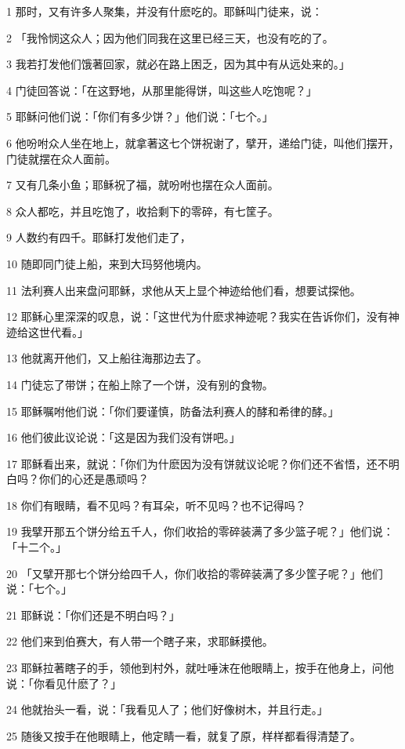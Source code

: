 \par 1 那时，又有许多人聚集，并没有什麽吃的。耶稣叫门徒来，说：
\par 2 「我怜悯这众人；因为他们同我在这里已经三天，也没有吃的了。
\par 3 我若打发他们饿著回家，就必在路上困乏，因为其中有从远处来的。」
\par 4 门徒回答说：「在这野地，从那里能得饼，叫这些人吃饱呢？」
\par 5 耶稣问他们说：「你们有多少饼？」他们说：「七个。」
\par 6 他吩咐众人坐在地上，就拿著这七个饼祝谢了，擘开，递给门徒，叫他们摆开，门徒就摆在众人面前。
\par 7 又有几条小鱼；耶稣祝了福，就吩咐也摆在众人面前。
\par 8 众人都吃，并且吃饱了，收拾剩下的零碎，有七筐子。
\par 9 人数约有四千。耶稣打发他们走了，
\par 10 随即同门徒上船，来到大玛努他境内。
\par 11 法利赛人出来盘问耶稣，求他从天上显个神迹给他们看，想要试探他。
\par 12 耶稣心里深深的叹息，说：「这世代为什麽求神迹呢？我实在告诉你们，没有神迹给这世代看。」
\par 13 他就离开他们，又上船往海那边去了。
\par 14 门徒忘了带饼；在船上除了一个饼，没有别的食物。
\par 15 耶稣嘱咐他们说：「你们要谨慎，防备法利赛人的酵和希律的酵。」
\par 16 他们彼此议论说：「这是因为我们没有饼吧。」
\par 17 耶稣看出来，就说：「你们为什麽因为没有饼就议论呢？你们还不省悟，还不明白吗？你们的心还是愚顽吗？
\par 18 你们有眼睛，看不见吗？有耳朵，听不见吗？也不记得吗？
\par 19 我擘开那五个饼分给五千人，你们收拾的零碎装满了多少篮子呢？」他们说：「十二个。」
\par 20 「又擘开那七个饼分给四千人，你们收拾的零碎装满了多少筐子呢？」他们说：「七个。」
\par 21 耶稣说：「你们还是不明白吗？」
\par 22 他们来到伯赛大，有人带一个瞎子来，求耶稣摸他。
\par 23 耶稣拉著瞎子的手，领他到村外，就吐唾沫在他眼睛上，按手在他身上，问他说：「你看见什麽了？」
\par 24 他就抬头一看，说：「我看见人了；他们好像树木，并且行走。」
\par 25 随後又按手在他眼睛上，他定睛一看，就复了原，样样都看得清楚了。
